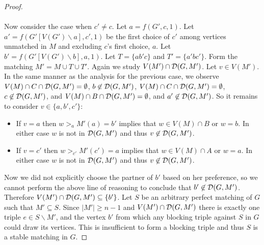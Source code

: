 \begin{proof}
\paragraph{}
Now consider the case when $c' \neq c$. Let $a = f(G',c,1)$. Let $a' = f(G'[V(G')\backslash a], c',1)$ be the first choice of $c'$ among vertices unmatched in $M$ and excluding $c$'s first choice, $a$. Let $b' = f(G'[V(G')\backslash b], a, 1)$. Let $T = \{ab'c\}$ and $T' = \{a'bc'\}$. Form the matching $M' = M \cup T \cup T'$. Again we study $V(M') \cap \mathcal{D}(G,M')$. Let $v \in V(M')$. In the same manner as the analysis for the previous case, we observe $V(M) \cap C \cap \mathcal{D}(G,M') = \emptyset$, $b \not \in \mathcal{D}(G,M')$, $V(M) \cap C \cap \mathcal{D}(G,M') = \emptyset $, $c\not\in \mathcal{D}(G,M')$, and $V(M) \cap B \cap \mathcal{D}(G,M') = \emptyset$, and $a' \not\in \mathcal{D}(G,M')$. So it remains to consider $v \in \{a, b', c'\}$:
\begin{itemize}
\item If $v = a$ then $w>_a M'(a) = b'$ implies that $w \in V(M) \cap B$ or $w = b$. In either case $w$ is not in $\mathcal{D}(G,M')$ and thus $v \not\in \mathcal{D}(G,M')$.
\item If $v = c'$ then $w>_{c'} M'(c') = a$ implies that $w \in V(M) \cap A$ or $w = a$. In either case $w$ is not in $\mathcal{D}(G,M')$ and thus $v \not\in \mathcal{D}(G,M')$.
\end{itemize}
Now we did not explicitly choose the partner of $b'$ based on her preference, so we cannot perform the above line of reasoning to conclude that $b' \not\in \mathcal{D}(G,M')$. Therefore $V(M') \cap \mathcal{D}(G,M') \subseteq \{b'\}$. Let $S$ be an arbitrary perfect matching of $G$ such that $M' \subseteq S$. Since $|M'| \geq n-1$ and $V(M') \cap \mathcal{D}(G,M')$ there is exactly  one triple $e \in S \backslash M'$, and the vertex $b'$ from which any blocking triple against $S$ in $G$ could draw its vertices. This is insufficient to form a blocking triple and thus $S$ is a stable matching in $G$.
\end{proof}
